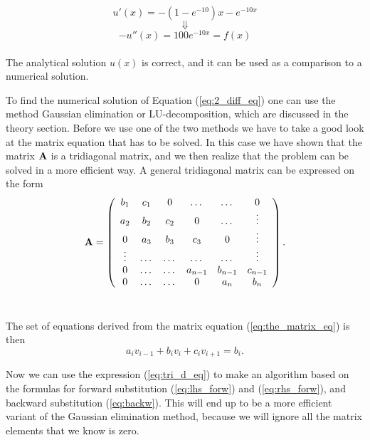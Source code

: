 \documentclass[12pt]{article}
\begin{document}
\begin{flushleft}
$$u'(x) = -(1-e^{-10})x-e^{-10x}$$
$$\Downarrow$$
$$-u''(x) = 100e^{-10x} = f(x)$$\\
\vspace{5mm}
The analytical solution $u(x)$ is correct, and it can be used as a comparison to a numerical solution.\\
\vspace{5mm}

To find the numerical solution of Equation (\ref{eq:2_diff_eq}) one can use the method Gaussian elimination or LU-decomposition, which are discussed in the theory section. Before we use one of the two methods we have to take a good look at the matrix equation that has to be solved. In this case we have shown that the matrix $\bf A$ is a tridiagonal matrix, and we then realize that the problem can be solved in a more efficient way. A general tridiagonal matrix can be expressed on the form\\

 $${\bf A} = 
    \left(\begin{array}{cccccc}
    b_{1} & c_{1}& 0 &\dots   & \dots &0 \\
    a_{2} & b_{2} & c_{2} &0 &\dots &\vdots \\
     0& a_{3} & b_{3} & c_{3} & 0 & \vdots \\
     \vdots & \dots   & \dots &\dots   &\dots & \vdots \\
     0&\dots   &\dots  & a_{n-1} & b_{n-1} & c_{n-1} \\
     0&\dots    &\dots  & 0  & a_{n} & b_{n} \\
    \end{array} \right).$$\\
\vspace{5mm}

The set of equations derived from the matrix equation (\ref{eq:the_matrix_eq}) is then\\

\begin{equation}\label{eq:tri_d_eq}
a_{i}v_{i-1} + b_{i}v_{i} + c_{i}v_{i+1} = b_{i}.
\end{equation}
\vspace{5mm}

Now we can use the expression (\ref{eq:tri_d_eq}) to make an algorithm based on the formulas for forward substitution (\ref{eq:lhs_forw}) and (\ref{eq:rhs_forw}), and backward substitution (\ref{eq:backw}). This will end up to be a more efficient variant of the Gaussian elimination method, because we will ignore all the matrix elements that we know is zero.\\


\end{flushleft}
\end{document}
